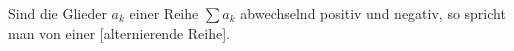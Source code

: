 Sind die Glieder $a_k$ einer Reihe $\sum a_k$ abwechselnd positiv und negativ, so spricht man von einer [alternierende Reihe].